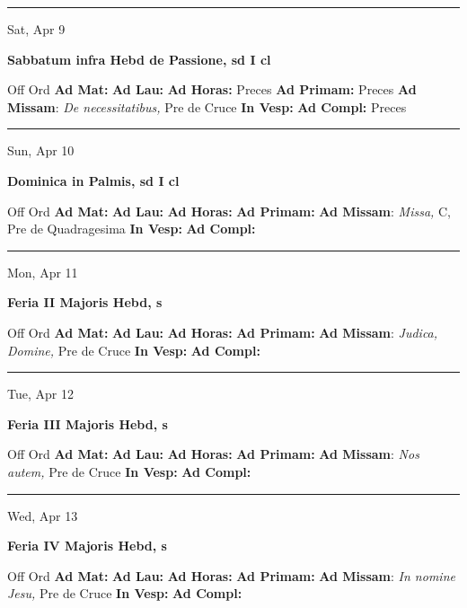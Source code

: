 \documentclass[letterpaper, 10pt]{article}
\begin{document}
\hrule
\begin{center}
Sat, Apr 9
\end{center}\textbf{ \large Sabbatum infra Hebd de Passione, \textnormal{\normalsize sd I cl}}
\begin{justify}
Off Ord
\textbf{Ad Mat: }
\textbf{Ad Lau: }
\textbf{Ad Horas: }Preces
\textbf{Ad Primam: }Preces
\textbf{Ad Missam}: \textit{De necessitatibus,} Pre de Cruce
\textbf{In Vesp: }
\textbf{Ad Compl: }Preces\end{justify}



\hrule
\begin{center}
Sun, Apr 10
\end{center}\textbf{ \large Dominica in Palmis, \textnormal{\normalsize sd I cl}}
\begin{justify}
Off Ord
\textbf{Ad Mat: }
\textbf{Ad Lau: }
\textbf{Ad Horas: }
\textbf{Ad Primam: }
\textbf{Ad Missam}: \textit{Missa,} C, Pre de Quadragesima
\textbf{In Vesp: }
\textbf{Ad Compl: }\end{justify}



\hrule
\begin{center}
Mon, Apr 11
\end{center}\textbf{ \large Feria II Majoris Hebd, \textnormal{\normalsize s}}
\begin{justify}
Off Ord
\textbf{Ad Mat: }
\textbf{Ad Lau: }
\textbf{Ad Horas: }
\textbf{Ad Primam: }
\textbf{Ad Missam}: \textit{Judica, Domine,} Pre de Cruce
\textbf{In Vesp: }
\textbf{Ad Compl: }\end{justify}



\hrule
\begin{center}
Tue, Apr 12
\end{center}\textbf{ \large Feria III Majoris Hebd, \textnormal{\normalsize s}}
\begin{justify}
Off Ord
\textbf{Ad Mat: }
\textbf{Ad Lau: }
\textbf{Ad Horas: }
\textbf{Ad Primam: }
\textbf{Ad Missam}: \textit{Nos autem,} Pre de Cruce
\textbf{In Vesp: }
\textbf{Ad Compl: }\end{justify}



\hrule
\begin{center}
Wed, Apr 13
\end{center}\textbf{ \large Feria IV Majoris Hebd, \textnormal{\normalsize s}}
\begin{justify}
Off Ord
\textbf{Ad Mat: }
\textbf{Ad Lau: }
\textbf{Ad Horas: }
\textbf{Ad Primam: }
\textbf{Ad Missam}: \textit{In nomine Jesu,} Pre de Cruce
\textbf{In Vesp: }
\textbf{Ad Compl: }\end{justify}
\end{document}
